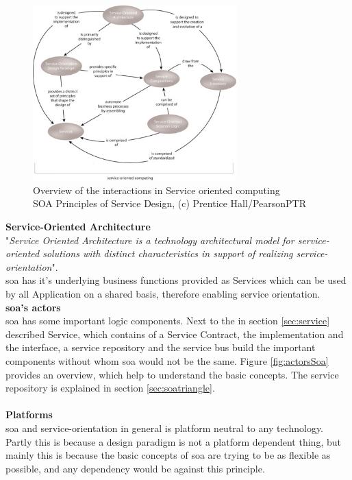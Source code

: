 \documentclass[12pt]{article}
\begin{document}
\begin{figure}[here!]
	\centering
	\includegraphics[width=0.7\textwidth]{images/serviceorientationdotcomwhatissoa}
	\caption{Overview of the interactions in Service oriented computing \cite{photos} \\ SOA Principles of Service Design, (c) Prentice Hall/PearsonPTR}
	\label{fig:serviceorientedcomuting}
	\end{figure}
	\FloatBarrier\noindent
\textbf{Service-Oriented Architecture}\\
"\textit{Service Oriented Architecture is a technology architectural model for service-oriented solutions with distinct characteristics in support of realizing service-orientation}"\cite[page 27]{grau}. \\
\gls{soa} has it's underlying business functions provided as Services which can be used by all Application on a shared basis, therefore enabling service orientation. \\
\newpage
\noindent
\textbf{\gls{soa}'s actors}\\
\gls{soa} has some important logic components. Next to the in section \ref{sec:service} described Service, which contains of a Service Contract, the implementation and the interface, a service repository and the service bus build the important components without whom \gls{soa} would not be the same. Figure \ref{fig:actorsSoa} provides an overview, which help to understand the basic concepts. The service repository is explained in section \ref{sec:soatriangle}.\\\\
\textbf{Platforms}\\
\gls{soa} and service-orientation in general is platform neutral to any technology. Partly this is because a design paradigm is not a platform dependent thing, but mainly this is because the basic concepts of \gls{soa} are trying to be as flexible as possible, and any dependency would be against this principle. \cite[page 29]{grau} 
\end{document}

